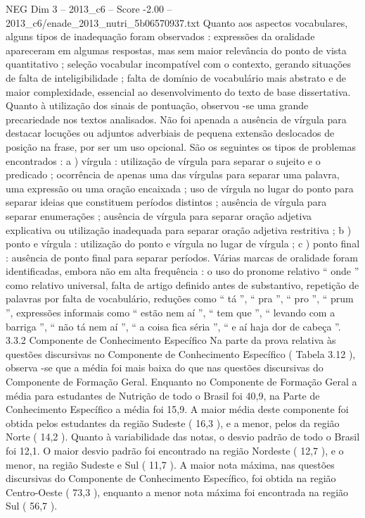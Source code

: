 \begin{textsample}{NEG Dim 3 – 2013\_c6 – Score -2.00 – 2013\_c6/enade\_2013\_nutri\_5b06570937.txt}
Quanto aos aspectos vocabulares, alguns tipos de inadequação foram observados : expressões da oralidade apareceram em algumas respostas, mas sem maior relevância do ponto de vista quantitativo ; seleção vocabular incompatível com o contexto, gerando situações de falta de inteligibilidade ; falta de domínio de vocabulário mais abstrato e de maior complexidade, essencial ao desenvolvimento do texto de base dissertativa.
Quanto à utilização dos sinais de pontuação, observou -se uma grande precariedade nos textos analisados.
Não foi apenada a ausência de vírgula para destacar locuções ou adjuntos adverbiais de pequena extensão deslocados de posição na frase, por ser um uso opcional.
São os seguintes os tipos de problemas encontrados : a ) vírgula : utilização de vírgula para separar o sujeito e o predicado ; ocorrência de apenas uma das vírgulas para separar uma palavra, uma expressão ou uma oração encaixada ; uso de vírgula no lugar do ponto para separar ideias que constituem períodos distintos ; ausência de vírgula para separar enumerações ; ausência de vírgula para separar oração adjetiva explicativa ou utilização inadequada para separar oração adjetiva restritiva ; b ) ponto e vírgula : utilização do ponto e vírgula no lugar de vírgula ; c ) ponto final : ausência de ponto final para separar períodos.
Várias marcas de oralidade foram identificadas, embora não em alta frequência : o uso do pronome relativo “ onde ” como relativo universal, falta de artigo definido antes de substantivo, repetição de palavras por falta de vocabulário, reduções como “ tá ”, “ pra ”, “ pro ”, “ prum ”, expressões informais como “ estão nem aí ”, “ tem que ”, “ levando com a barriga ”, “ não tá nem aí ”, “ a coisa fica séria ”, “ e aí haja dor de cabeça ”. 3.3.2 Componente de Conhecimento Específico Na parte da prova relativa às questões discursivas no Componente de Conhecimento Específico ( Tabela 3.12 ), observa -se que a média foi mais baixa do que nas questões discursivas do Componente de Formação Geral.
Enquanto no Componente de Formação Geral a média para estudantes de Nutrição de todo o Brasil foi 40,9, na Parte de Conhecimento Específico a média foi 15,9.
A maior média deste componente foi obtida pelos estudantes da região Sudeste ( 16,3 ), e a menor, pelos da região Norte ( 14,2 ).
Quanto à variabilidade das notas, o desvio padrão de todo o Brasil foi 12,1.
O maior desvio padrão foi encontrado na região Nordeste ( 12,7 ), e o menor, na região Sudeste e Sul ( 11,7 ).
A maior nota máxima, nas questões discursivas do Componente de Conhecimento Específico, foi obtida na região Centro-Oeste ( 73,3 ), enquanto a menor nota máxima foi encontrada na região Sul ( 56,7 ).

\end{textsample}
